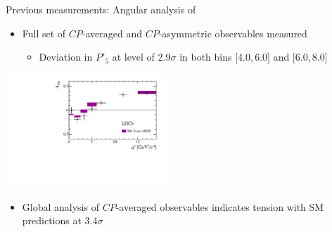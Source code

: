 \documentclass[aspectratio=1610]{beamer}
\begin{document}
\begin{frame}{Previous measurements: Angular analysis of \BdToKstmm}

\begin{itemize}
  \item Full set of $CP$-averaged and $CP$-asymmetric observables measured
  \begin{itemize}
    \item[\ding{70}] Deviation in $P'_{5}$ at level of 2.9$\sigma$ in both bins [4.0,\,6.0] and [6.0,\,8.0] \gevgevcccc
  \end{itemize}
\end{itemize}

\begin{center}
\includegraphics[width=0.45\textwidth]{figs/kpimm/introduction/AFB.pdf}
\end{center}

\begin{itemize}
  \item Global analysis of $CP$-averaged observables indicates tension with SM predictions at 3.4$\sigma$
\end{itemize}

\end{frame}
\end{document}
